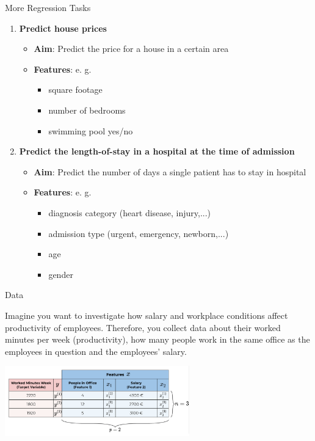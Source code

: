 \documentclass[11pt,compress,t,notes=noshow, xcolor=table]{beamer}
\begin{document}
\begin{vbframe}{More Regression Tasks}
\begin{enumerate}
\item \textbf{Predict house prices}
\medskip
\begin{itemize}
\item \textbf{Aim}: Predict the price for a house in a certain area
\item \textbf{Features}: e. g.
\begin{itemize}
\item square footage
\item number of bedrooms
\item swimming pool yes/no
\end{itemize}
\end{itemize}
\item \textbf{Predict the length-of-stay in a hospital at the time of admission}
\begin{itemize}
\item \textbf{Aim}: Predict the number of days a single patient has to stay in hospital
\item \textbf{Features}: e. g.
\begin{itemize}
\item diagnosis category (heart disease, injury,...)
\item admission type (urgent, emergency, newborn,...)
\item age
\item gender
\end{itemize}
\end{itemize}
\end{enumerate}
\end{vbframe}


\begin{vbframe}{Data}

Imagine you want to investigate how salary and workplace conditions
affect productivity of employees. Therefore, you collect data about
their worked minutes per week (productivity), how many people work in the
same office as the employees in question and the employees' salary.

\begin{center}\includegraphics[width=0.6\textwidth]{figure_man/data_table} \end{center}

\end{vbframe}
\end{document}
